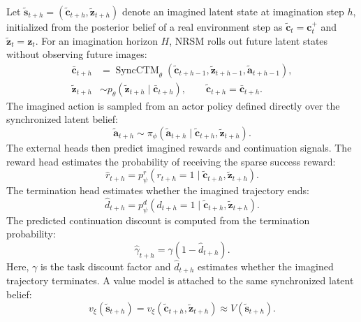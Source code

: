 \documentclass{article}
\begin{document}
Let $\tilde{\mathbf s}_{t+h}=(\tilde{\mathbf c}_{t+h},\tilde{\mathbf z}_{t+h})$ denote an imagined latent state at imagination step $h$, initialized from the posterior belief of a real environment step as $\tilde{\mathbf c}_{t}=\mathbf c_t^+$ and $\tilde{\mathbf z}_{t}=\mathbf z_t$. For an imagination horizon $H$, NRSM rolls out future latent states without observing future images:
\begin{align}
\bar{\mathbf c}_{t+h}
&=
\operatorname{SyncCTM}_{\theta}(
\tilde{\mathbf c}_{t+h-1},
\tilde{\mathbf z}_{t+h-1},
\tilde{\mathbf a}_{t+h-1}),
\label{eq:imagined_context}\\
\tilde{\mathbf z}_{t+h}
&\sim
p_{\theta}(\tilde{\mathbf z}_{t+h}\mid\bar{\mathbf c}_{t+h}),
\qquad
\tilde{\mathbf c}_{t+h}=\bar{\mathbf c}_{t+h}.
\label{eq:imagined_latent}
\end{align}
The imagined action is sampled from an actor policy defined directly over the synchronized latent belief:
\begin{equation}
\tilde{\mathbf a}_{t+h}
\sim
\pi_{\phi}(
\tilde{\mathbf a}_{t+h}
\mid
\tilde{\mathbf c}_{t+h},\tilde{\mathbf z}_{t+h}).
\label{eq:imagined_actor}
\end{equation}
The external heads then predict imagined rewards and continuation signals. The reward head estimates the probability of receiving the sparse success reward:
\begin{equation}
\hat r_{t+h}
=
p_{\psi}^{r}(
r_{t+h}=1
\mid
\tilde{\mathbf c}_{t+h},\tilde{\mathbf z}_{t+h}).
\label{eq:imagined_reward}
\end{equation}
The termination head estimates whether the imagined trajectory ends:
\begin{equation}
\hat d_{t+h}
=
p_{\psi}^{d}(
d_{t+h}=1
\mid
\tilde{\mathbf c}_{t+h},\tilde{\mathbf z}_{t+h}).
\label{eq:imagined_termination}
\end{equation}
The predicted continuation discount is computed from the termination probability:
\begin{equation}
\hat \gamma_{t+h}
=
\gamma(1-\hat d_{t+h}).
\label{eq:imagined_discount}
\end{equation}
Here, $\gamma$ is the task discount factor and $\hat d_{t+h}$ estimates whether the imagined trajectory terminates. A value model is attached to the same synchronized latent belief:
\begin{equation}
v_{\xi}(\tilde{\mathbf s}_{t+h})
=
v_{\xi}(\tilde{\mathbf c}_{t+h},\tilde{\mathbf z}_{t+h})
\approx
V(\tilde{\mathbf s}_{t+h}).
\label{eq:value_model}
\end{equation}
\end{document}
